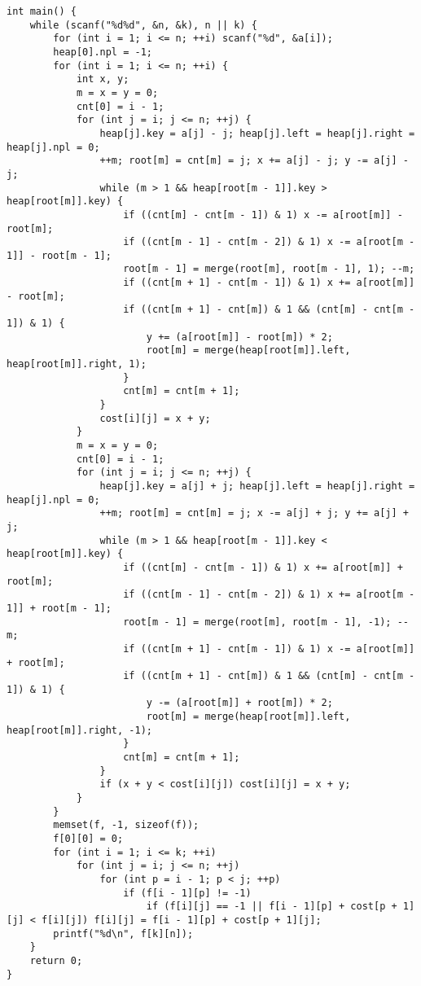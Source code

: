 \begin{verbatim}
int main() {
	while (scanf("%d%d", &n, &k), n || k) {
		for (int i = 1; i <= n; ++i) scanf("%d", &a[i]);
		heap[0].npl = -1;
		for (int i = 1; i <= n; ++i) {
			int x, y;
			m = x = y = 0;
			cnt[0] = i - 1;
			for (int j = i; j <= n; ++j) {
				heap[j].key = a[j] - j; heap[j].left = heap[j].right = heap[j].npl = 0;
				++m; root[m] = cnt[m] = j; x += a[j] - j; y -= a[j] - j;
				while (m > 1 && heap[root[m - 1]].key > heap[root[m]].key) {
					if ((cnt[m] - cnt[m - 1]) & 1) x -= a[root[m]] - root[m];
					if ((cnt[m - 1] - cnt[m - 2]) & 1) x -= a[root[m - 1]] - root[m - 1];
					root[m - 1] = merge(root[m], root[m - 1], 1); --m;
					if ((cnt[m + 1] - cnt[m - 1]) & 1) x += a[root[m]] - root[m];
					if ((cnt[m + 1] - cnt[m]) & 1 && (cnt[m] - cnt[m - 1]) & 1) {
						y += (a[root[m]] - root[m]) * 2;
						root[m] = merge(heap[root[m]].left, heap[root[m]].right, 1);
					}
					cnt[m] = cnt[m + 1];
				}
				cost[i][j] = x + y;
			}
			m = x = y = 0;
			cnt[0] = i - 1;
			for (int j = i; j <= n; ++j) {
				heap[j].key = a[j] + j; heap[j].left = heap[j].right = heap[j].npl = 0;
				++m; root[m] = cnt[m] = j; x -= a[j] + j; y += a[j] + j;
				while (m > 1 && heap[root[m - 1]].key < heap[root[m]].key) {
					if ((cnt[m] - cnt[m - 1]) & 1) x += a[root[m]] + root[m];
					if ((cnt[m - 1] - cnt[m - 2]) & 1) x += a[root[m - 1]] + root[m - 1];
					root[m - 1] = merge(root[m], root[m - 1], -1); --m;
					if ((cnt[m + 1] - cnt[m - 1]) & 1) x -= a[root[m]] + root[m];
					if ((cnt[m + 1] - cnt[m]) & 1 && (cnt[m] - cnt[m - 1]) & 1) {
						y -= (a[root[m]] + root[m]) * 2;
						root[m] = merge(heap[root[m]].left, heap[root[m]].right, -1);
					}
					cnt[m] = cnt[m + 1];
				}
				if (x + y < cost[i][j]) cost[i][j] = x + y;
			}
		}
		memset(f, -1, sizeof(f));
		f[0][0] = 0;
		for (int i = 1; i <= k; ++i)
			for (int j = i; j <= n; ++j)
				for (int p = i - 1; p < j; ++p)
					if (f[i - 1][p] != -1)
						if (f[i][j] == -1 || f[i - 1][p] + cost[p + 1][j] < f[i][j]) f[i][j] = f[i - 1][p] + cost[p + 1][j];
		printf("%d\n", f[k][n]);
	}
	return 0;
}
\end{verbatim}
